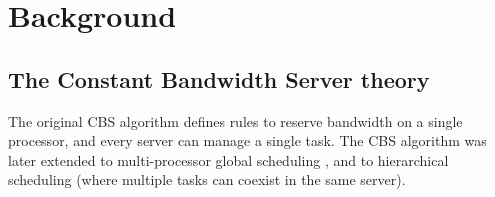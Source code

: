 \chapter{Background\label{chap:background}}


\section{The Constant Bandwidth Server theory\label{sec:CBS}}
%
%

%
%
The original
CBS algorithm \cite{AbeniB98} defines rules to reserve bandwidth on a
single processor, and every server can manage a single task. The CBS
algorithm was later extended to multi-processor global scheduling
\cite{baruah2002implementing}, and to hierarchical scheduling
\cite{lipari2001hierarchical,journals/jec/LipariB05,Lip05-comp} (where
multiple tasks can coexist in the same server).

